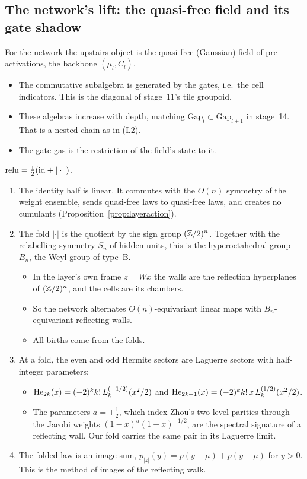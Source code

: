 \subsection{The network's lift: the quasi-free field and its gate shadow}
For the network the upstairs object is the quasi-free (Gaussian) field of pre-activations, the backbone $(\mu_l,C_l)$.
\begin{itemize}[leftmargin=*]
\item The commutative subalgebra is generated by the gates, i.e.\ the cell indicators. This is the diagonal of stage~11's tile
groupoid.
\item These algebras increase with depth, matching $\mathrm{Gap}_l\subset\mathrm{Gap}_{l+1}$ in stage~14. That is a nested chain as in (L2).
\item The gate gas is the restriction of the field's state to it.
\end{itemize}
\begin{proposition}\label{prop:fold}
$\operatorname{relu}=\frac12(\mathrm{id}+|\cdot|)$.
\begin{enumerate}[leftmargin=*]
\item The identity half is linear. It commutes with the $O(n)$ symmetry of the weight ensemble, sends quasi-free laws to quasi-free laws,
and creates no cumulants (Proposition~\ref{prop:layeraction}).
\item The fold $|\cdot|$ is the quotient by the sign group $(\mathbb Z/2)^n$. Together with the relabelling symmetry $S_n$ of hidden units, this is
the hyperoctahedral group $B_n$, the Weyl group of type~B.
\begin{itemize}
\item In the layer's own frame $z=Wx$ the walls are the reflection hyperplanes of $(\mathbb Z/2)^n$, and the cells are its chambers.
\item So the network alternates $O(n)$-equivariant linear maps with $B_n$-equivariant reflecting walls.
\item All births come from the folds.
\end{itemize}
\item At a fold, the even and odd Hermite sectors are Laguerre sectors with half-integer parameters:
\begin{itemize}
\item $\mathrm{He}_{2k}(x)=(-2)^kk!\,L_k^{(-1/2)}(x^2/2)$ and $\mathrm{He}_{2k+1}(x)=(-2)^kk!\,x\,L_k^{(1/2)}(x^2/2)$.
\item The parameters $a=\pm\frac12$, which index Zhou's two level parities through the Jacobi weights $(1-x)^a(1+x)^{-1/2}$, are the
spectral signature of a reflecting wall. Our fold carries the same pair in its Laguerre limit.
\end{itemize}
\item The folded law is an image sum, $p_{|z|}(y)=p(y-\mu)+p(y+\mu)$ for $y>0$. This is the method of images of the reflecting walk.
\end{enumerate}
\end{proposition}

